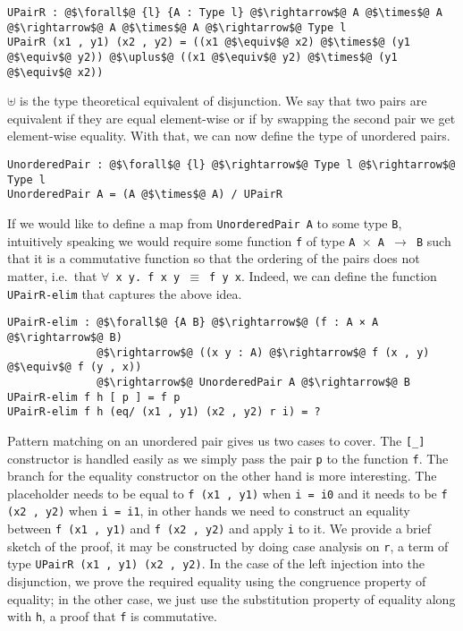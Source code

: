 \documentclass[12pt,twoside,maitrise]{dms}
\theoremstyle{definition}
\numberwithin{equation}{section}
\numberwithin{table}{chapter}
\numberwithin{figure}{chapter}
\newcommand\id[1] {\texttt{#1}}
\newcommand\fn[1] {\texttt{#1}}
\begin{document}
\begin{verbatim}
UPairR : @$\forall$@ {l} {A : Type l} @$\rightarrow$@ A @$\times$@ A @$\rightarrow$@ A @$\times$@ A @$\rightarrow$@ Type l
UPairR (x1 , y1) (x2 , y2) = ((x1 @$\equiv$@ x2) @$\times$@ (y1 @$\equiv$@ y2)) @$\uplus$@ ((x1 @$\equiv$@ y2) @$\times$@ (y1 @$\equiv$@ x2))
\end{verbatim}

$\uplus$ is the type theoretical equivalent of disjunction. We say that two
pairs are equivalent if they are equal element-wise or if by swapping the second
pair we get element-wise equality. With that, we can now define the type of
unordered pairs.

\begin{verbatim}
UnorderedPair : @$\forall$@ {l} @$\rightarrow$@ Type l @$\rightarrow$@ Type l
UnorderedPair A = (A @$\times$@ A) / UPairR
\end{verbatim}

If we would like to define a map from \fn{UnorderedPair A} to some type \id{B},
intuitively speaking we would require some function \id{f} of type \fn{A
  $\times$ A $\rightarrow$ B} such that it is a commutative function so that the
ordering of the pairs does not matter, i.e.\ that \fn{$\forall$ x y. f x y
  $\equiv$ f y x}. Indeed, we can define the function \id{UPairR-elim} that
captures the above idea.

\begin{verbatim}
UPairR-elim : @$\forall$@ {A B} @$\rightarrow$@ (f : A × A @$\rightarrow$@ B)
              @$\rightarrow$@ ((x y : A) @$\rightarrow$@ f (x , y) @$\equiv$@ f (y , x))
              @$\rightarrow$@ UnorderedPair A @$\rightarrow$@ B
UPairR-elim f h [ p ] = f p
UPairR-elim f h (eq/ (x1 , y1) (x2 , y2) r i) = ?
\end{verbatim}

Pattern matching on an unordered pair gives us two cases to cover. The \id{[\_]}
constructor is handled easily as we simply pass the pair \id{p} to the function
\id{f}. The branch for the equality constructor on the other hand is more
interesting. The placeholder needs to be equal to \fn{f (x1 , y1)} when \fn{i =
  i0} and it needs to be \fn{f (x2 , y2)} when \fn{i = i1}, in other hands we
need to construct an equality between \fn{f (x1 , y1)} and \fn{f (x2 , y2)} and
apply \id{i} to it. We provide a brief sketch of the proof, it may be
constructed by doing case analysis on \id{r}, a term of type \fn{UPairR (x1 ,
  y1) (x2 , y2)}. In the case of the left injection into the disjunction, we
prove the required equality using the congruence property of equality; in the
other case, we just use the substitution property of equality along with \id{h},
a proof that \id{f} is commutative.
\end{document}

